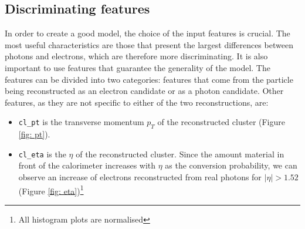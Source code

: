 \documentclass[a4paper, oneside, 11pt, openright]{book}
\begin{document}
			\subsection{Discriminating features}
				In order to create a good model, the choice of the input features is crucial. The most useful characteristics are those that present the largest differences between photons and electrons, which are therefore more discriminating. It is also important to use features that guarantee the generality of the model. The features can be divided into two categories: features that come from the particle being reconstructed as an electron candidate or as a photon candidate. Other features, as they are not specific to either of the two reconstructions, are:
				\begin{itemize}
					\item \texttt{cl\_pt} is the transverse momentum $p_T$ of the reconstructed cluster (Figure \ref{fig: pt}).
					\item \texttt{cl\_eta} is the $\eta$ of the reconstructed cluster. Since the amount material in front of the calorimeter increases with $\eta$ as the conversion probability, we can observe an increase of electrons reconstructed from real photons for $|\eta|>1.52$ (Figure \ref{fig: eta})\footnote{All histogram plots are normalised}%
				\end{itemize}
\end{document}

